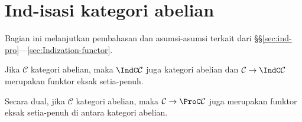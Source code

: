 \section{Ind-isasi kategori abelian}\label{sec:Indization-Abel}
Bagian ini melanjutkan pembahasan dan asumsi-asumsi terkait dari \S\S\ref{sec:ind-pro}---\ref{sec:Indization-functor}.

\begin{theorem}\label{prop:Ind-Abel}
	Jika $\mathcal{C}$ kategori abelian, maka $\IndC\mathcal{C}$ juga kategori abelian dan $\mathcal{C}\to\IndC\mathcal{C}$ merupakan funktor eksak setia-penuh.
	
	Secara dual, jika $\mathcal{C}$ kategori abelian, maka $\mathcal{C}\to\ProC\mathcal{C}$ juga merupakan funktor eksak setia-penuh di antara kategori abelian.
\end{theorem}
